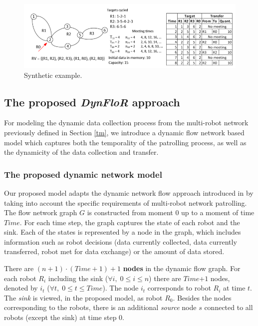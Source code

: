 \begin{figure}[!htb]
\centering
\includegraphics[scale=0.45]{Figures/KES_Figure3.png}
\caption{Synthetic example.}
\label{ex}
\end{figure}

\subsection{The proposed \emph{DynFloR} approach}\label{df}

For modeling the dynamic data collection process from the multi-robot network previously defined in Section \ref{tm}, we introduce a dynamic flow network based model which captures both the temporality of the patrolling process, as well as the dynamicity of the data collection and transfer. 

\subsubsection{The proposed dynamic network model}\label{model} 

Our proposed model adapts the dynamic network flow approach introduced in \cite{flow} by taking into account the specific requirements of multi-robot network patrolling. The flow network graph $G$ is constructed from moment 0 up to a moment of time $Time$. For each time step, the graph captures the state of each robot and the sink. Each of the states is represented by a node in the graph, which includes information such as robot decisions (data currently collected, data currently transferred, robot met for data exchange) or the amount of data stored. 

There are $(n+1) \cdot (Time+1) + 1$ \textbf{nodes} in the dynamic flow graph. For each robot $R_i$ including the sink ($\forall i, \; 0 \leq i \leq n$) there are $Time$+$1$ nodes, denoted by $i_t$ ($\forall t, \; 0 \leq t \leq Time$). The node $i_t$ corresponds to robot $R_i$ at time $t$. The \emph{sink} is viewed, in the proposed model, as robot $R_0$.  Besides the nodes corresponding to the robots, there is an additional \emph{source} node $s$ connected to all robots (except the sink) at time step 0.


